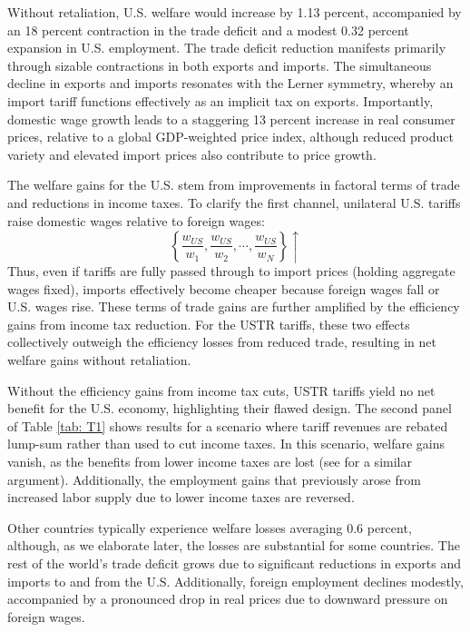 \documentclass[12pt]{article}
\begin{document}
Without retaliation, U.S. welfare would increase by 1.13 percent, accompanied by an 18 percent contraction in the trade deficit and a modest 0.32 percent expansion in U.S. employment. The trade deficit reduction manifests primarily through sizable contractions in both exports and imports. The simultaneous decline in exports and imports resonates with the Lerner symmetry, whereby an import tariff functions effectively as an implicit tax on exports. Importantly, domestic wage growth leads to a staggering 13 percent increase in real consumer prices, relative to a global GDP-weighted price index, although reduced product variety and elevated import prices also contribute to price growth.

The welfare gains for the U.S. stem from improvements in factoral terms of trade and reductions in income taxes. To clarify the first channel, unilateral U.S. tariffs raise domestic wages relative to foreign wages:
\[
\left\{ \frac{w_{US}}{w_{1}},\frac{w_{US}}{w_{2}},\cdots,\frac{w_{US}}{w_{N}}\right\} \uparrow
\]
Thus, even if tariffs are fully passed through to import prices (holding aggregate wages fixed), imports effectively become cheaper because foreign wages fall or U.S. wages rise. These terms of trade gains are further amplified by the efficiency gains from income tax reduction. For the USTR tariffs, these two effects collectively outweigh the efficiency losses from reduced trade, resulting in net welfare gains without retaliation.

Without the efficiency gains from income tax cuts, USTR tariffs yield no net benefit for the U.S. economy, highlighting their flawed design.
The second panel of Table \ref{tab: T1} shows results for a scenario where tariff revenues are rebated lump-sum rather than used to cut income taxes. In this scenario, welfare gains vanish, as the benefits from lower income taxes are lost (see \citet{Alessandria_revenue2025} for a similar argument). Additionally, the employment gains that previously arose from increased labor supply due to lower income taxes are reversed.

Other countries typically experience welfare losses averaging 0.6 percent, although, as we elaborate later, the losses are substantial for some countries. The rest of the world's trade deficit grows due to significant reductions in exports and imports to and from the U.S. Additionally, foreign employment declines modestly, accompanied by a pronounced drop in real prices due to downward pressure on foreign wages. 
\end{document}
